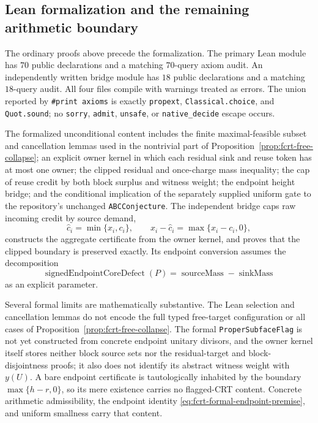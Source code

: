 \subsection{Lean formalization and the remaining arithmetic boundary}

The ordinary proofs above precede the formalization.  The primary Lean
module has $70$ public declarations and a matching $70$-query axiom audit.
An independently written bridge module has $18$ public declarations and a
matching $18$-query audit.  All four files compile with warnings treated as
errors.  The union reported by \texttt{\#print axioms} is exactly
\texttt{propext}, \texttt{Classical.choice}, and \texttt{Quot.sound}; no
\texttt{sorry}, \texttt{admit}, \texttt{unsafe}, or
\texttt{native\_decide} escape occurs.

The formalized unconditional content includes the finite maximal-feasible
subset and cancellation lemmas used in the nontrivial part of
Proposition~\ref{prop:fcrt-free-collapse}; an explicit owner kernel in which
each residual sink and reuse token has at most one owner; the clipped
residual and once-charge mass inequality; the cap of reuse credit by both
block surplus and witness weight; the endpoint height bridge; and the
conditional implication of the separately supplied uniform gate to the
repository's unchanged \texttt{ABCConjecture}.  The independent bridge caps
raw incoming credit by source demand,
\[
                 \widehat c_i=\min\{x_i,c_i\},
 \qquad x_i-\widehat c_i=\max\{x_i-c_i,0\},
\]
constructs the aggregate certificate from the owner kernel, and proves that
the clipped boundary is preserved exactly.  Its endpoint conversion assumes
the decomposition
\[
 \operatorname{signedEndpointCoreDefect}(P)
 =\operatorname{sourceMass}-\operatorname{sinkMass}
\tag{FCRT-33}\label{eq:fcrt-formal-endpoint-premise}
\]
as an explicit parameter.

Several formal limits are mathematically substantive.  The Lean selection
and cancellation lemmas do not encode the full typed free-target
configuration or all cases of Proposition~\ref{prop:fcrt-free-collapse}.
The formal \texttt{ProperSubfaceFlag} is not yet constructed from concrete
endpoint unitary divisors, and the owner kernel itself stores neither block
source sets nor the residual-target and block-disjointness proofs; it also
does not identify its abstract witness weight with $y(U)$.  A bare endpoint
certificate is tautologically inhabited by the boundary
$\max\{h-r,0\}$, so its mere existence carries no flagged-CRT content.
Concrete arithmetic admissibility, the endpoint identity
\eqref{eq:fcrt-formal-endpoint-premise}, and uniform smallness carry that
content.

